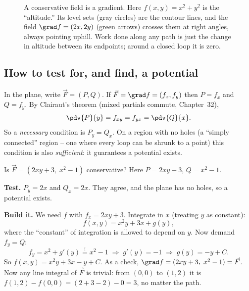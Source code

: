 \begin{figure}[H]
\caption{A conservative field is a gradient. Here $f(x,y)=x^2+y^2$ is the
``altitude.'' Its level sets (gray circles) are the contour lines, and the field
$\grad f=(2x,2y)$ (green arrows) crosses them at right angles, always pointing
uphill. Work done along any path is just the change in altitude between its
endpoints; around a closed loop it is zero.}
\label{ch35:fig-gradient}
\end{figure}

\subsection{How to test for, and find, a potential}

In the plane, write $\vec F=(P,Q)$. If $\vec F=\grad f=(f_x,f_y)$ then
$P=f_x$ and $Q=f_y$. By Clairaut's theorem (mixed partials commute, Chapter~32),
\[
  \pdv{P}{y} = f_{xy} = f_{yx} = \pdv{Q}{x}.
\]
So a \emph{necessary} condition is $P_y = Q_x$. On a region with no holes (a
``simply connected'' region -- one where every loop can be shrunk to a point) this
condition is also \emph{sufficient}: it guarantees a potential exists.

\begin{example}
\label{ch35:ex-potential}
Is $\vec F=(2xy + 3,\; x^2 - 1)$ conservative? Here $P=2xy+3$, $Q=x^2-1$.

\textbf{Test.} $P_y = 2x$ and $Q_x = 2x$. They agree, and the plane has no holes,
so a potential exists.

\textbf{Build it.} We need $f$ with $f_x = 2xy+3$. Integrate in $x$ (treating $y$
as constant):
\[
  f(x,y) = x^2 y + 3x + g(y),
\]
where the ``constant'' of integration is allowed to depend on $y$. Now demand
$f_y = Q$:
\[
  f_y = x^2 + g'(y) \overset{!}{=} x^2 - 1 \;\Rightarrow\; g'(y) = -1 \;\Rightarrow\; g(y) = -y + C.
\]
So $f(x,y) = x^2y + 3x - y + C$. As a check, $\grad f = (2xy+3,\; x^2-1)=\vec F$.
Now any line integral of $\vec F$ is trivial: from $(0,0)$ to $(1,2)$ it is
$f(1,2)-f(0,0) = (2 + 3 - 2) - 0 = 3$, no matter the path.
\end{example}

